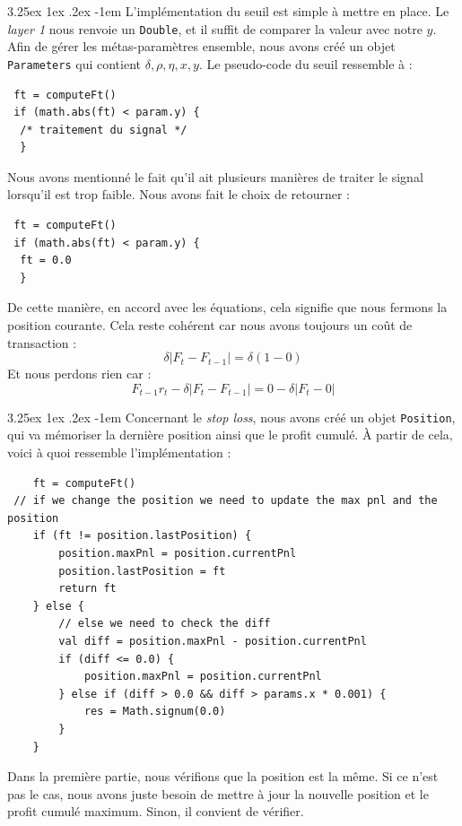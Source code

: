 \documentclass[a4paper, 11pt]{article}
\makeatletter
\renewcommand\paragraph{\@startsection{paragraph}{5}{\z@}%
  {3.25ex \@plus1ex \@minus.2ex}%
  {-1em}%
  {\normalfont\normalsize\bfseries}}
\makeatother
\begin{document}
\paragraph{}
L'implémentation du seuil est simple à mettre en place. Le \textit{layer 1} nous renvoie un \texttt{Double}, et il suffit de comparer la valeur avec notre
$y$. Afin de gérer les métas-paramètres ensemble, nous avons créé un objet \texttt{Parameters} qui contient $\delta,\rho,\eta,x,y$. Le pseudo-code
du seuil ressemble à :

\begin{lstlisting}
 ft = computeFt()
 if (math.abs(ft) < param.y) {
  /* traitement du signal */
  }
\end{lstlisting}

Nous avons mentionné le fait qu'il ait plusieurs manières de traiter le signal lorsqu'il est trop faible. Nous avons fait le choix de
retourner :
\begin{lstlisting}
 ft = computeFt()
 if (math.abs(ft) < param.y) {
  ft = 0.0
  }
\end{lstlisting}
De cette manière, en accord avec les équations, cela signifie que nous fermons la position courante. Cela reste cohérent car nous avons
toujours un coût de transaction :
$$ \delta |F_t - F_{t-1}| = \delta (1 - 0)$$
Et nous perdons rien car :
$$ F_{t-1} r_t - \delta | F_t - F_{t-1}| = 0 - \delta | F_t - 0 |$$

\paragraph{}
Concernant le \textit{stop loss}, nous avons créé un objet \texttt{Position}, qui va mémoriser la dernière position ainsi que le profit
cumulé. À partir de cela, voici à quoi ressemble l'implémentation :
\begin{lstlisting}
    ft = computeFt()
 // if we change the position we need to update the max pnl and the position
    if (ft != position.lastPosition) {
        position.maxPnl = position.currentPnl
        position.lastPosition = ft
        return ft
    } else {
        // else we need to check the diff
        val diff = position.maxPnl - position.currentPnl
        if (diff <= 0.0) {
            position.maxPnl = position.currentPnl
        } else if (diff > 0.0 && diff > params.x * 0.001) {
            res = Math.signum(0.0)
        }
    }
\end{lstlisting}

Dans la première partie, nous vérifions que la position est la même. Si ce n'est pas le cas, nous avons juste besoin de mettre à jour la nouvelle
position et le profit cumulé maximum. Sinon, il convient de vérifier.
\end{document}

